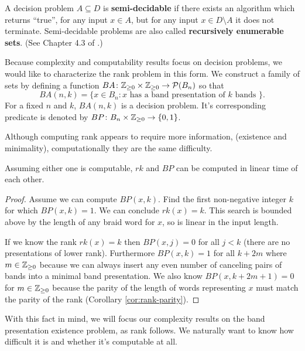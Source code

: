 \documentclass[12pt]{thesis}
\begin{document}
\begin{definition}
    A decision problem $A \subseteq D$ is \textbf{semi-decidable} if there exists an algorithm
    which returns ``true'', for any input $x \in A$,
    but for any input $x \in D \setminus A$ it does not terminate.
    Semi-decidable problems are also called \textbf{recursively enumerable sets}.
    (See Chapter 4.3 of \cite{logical-foundations-of-math}.)
\end{definition}

Because complexity and computability results focus on decision problems,
we would like to characterize the rank problem in this form.
We construct a family of sets 
by defining a function
$BA \colon \mathbb{Z}_{\geq 0} \times \mathbb{Z}_{\geq 0} \rightarrow \mathcal{P}(B_{n})$ 
so that 
\begin{equation} 
    BA(n, k) = \{ x \in B_{n} \colon x \text{ has a band presentation of $k$ bands } \}.
\end{equation}
For a fixed $n$ and $k$,  $BA(n, k)$ is a decision problem.
It's corresponding predicate is denoted by $BP \colon B_{n} \times \mathbb{Z}_{\geq 0} \rightarrow \{ 0, 1 \}$.


Although computing rank appears to require more information,
(existence and minimality), computationally they are the same difficulty.
\begin{proposition}
    Assuming either one is computable, $rk$ and $BP$ can be computed in linear time of each other.
\end{proposition}
\begin{proof}
    Assume we can compute $BP(x, k)$.
    Find the first non-negative integer $k$ for which $BP(x, k) = 1$.
    We can conclude $rk(x) = k$.
    This search is bounded above by the length of any braid word for $x$, so is linear in the input length.

    If we know the rank $rk(x) = k$
    then $BP(x, j) = 0$ for all $j < k$ (there are no presentations of lower rank).
    Furthermore $BP(x, k) = 1$ for all $k + 2m$ where $m \in \mathbb{Z}_{\geq 0}$
    because we can always insert any even number of canceling pairs of bands into 
    a minimal band presentation.
    We also know $BP(x, k + 2m + 1) = 0$ for $m \in \mathbb{Z}_{\geq 0}$ because
    the parity of the length of words representing $x$ must
    match the parity of the rank (Corollary \ref{cor:rank-parity}).
\end{proof}

With this fact in mind, we will focus our complexity results on the band presentation existence problem,
as rank follows.
We naturally want to know how difficult it is and whether it's computable at all.
\end{document}
